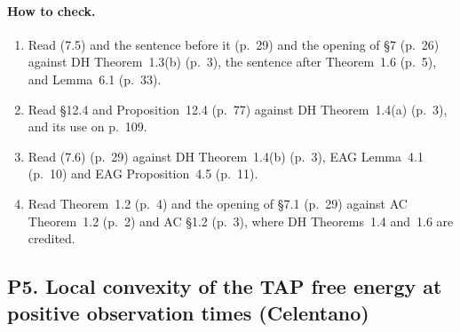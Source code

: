\documentclass[11pt]{article}
\newcommand{\ploc}[2]{#1}
\begin{document}
\paragraph{How to check.}
\begin{enumerate}
\item Read \ploc{(7.5) and the sentence before it (p.~29)}{profile-spectral.tex:1338--1347}
 and \ploc{the opening of \S7 (p.~26)}{profile-spectral.tex:1125--1140}
 against DH Theorem~1.3(b) (p.~3), the sentence after Theorem~1.6 (p.~5), and
 Lemma~6.1 (p.~33).
\item Read \ploc{\S12.4 and Proposition~12.4 (p.~77)}{profile-amplification.tex:925--949}
 against DH Theorem~1.4(a) (p.~3), and its use
 \ploc{on p.~109}{profile-entropy.tex:410--425}.
\item Read \ploc{(7.6) (p.~29)}{profile-spectral.tex:1349--1367} against DH
 Theorem~1.4(b) (p.~3), EAG Lemma~4.1 (p.~10) and EAG Proposition~4.5
 (p.~11).
\item Read \ploc{Theorem~1.2 (p.~4)}{introduction.tex:80--103} and
 \ploc{the opening of \S7.1 (p.~29)}{profile-spectral.tex:1330--1336} against
 \ploc{AC Theorem~1.2 (p.~2) and AC \S1.2 (p.~3)}{introduction.tex:71--76,
 130--155}, where DH Theorems~1.4 and~1.6 are credited.
\end{enumerate}
\subsection{P5. Local convexity of the TAP free energy at positive observation times (Celentano)}\label{f:P5}
\end{document}

